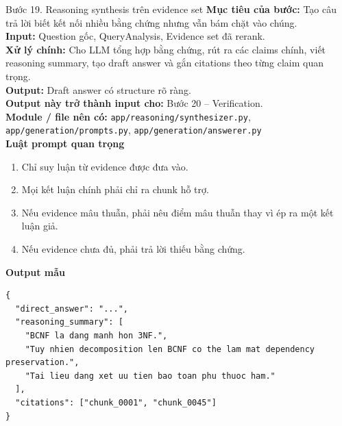 \documentclass[12pt,a4paper]{article}
\newcommand{\stepgoal}[1]{\textbf{Mục tiêu của bước:} #1\\}
\newcommand{\stepinput}[1]{\textbf{Input:} #1\\}
\newcommand{\stepprocess}[1]{\textbf{Xử lý chính:} #1\\}
\newcommand{\stepoutput}[1]{\textbf{Output:} #1\\}
\newcommand{\stepnext}[1]{\textbf{Output này trở thành input cho:} #1\\}
\newcommand{\stepmodules}[1]{\textbf{Module / file nên có:} #1\\}
\begin{document}
\begin{stepbox}{Bước 19. Reasoning synthesis trên evidence set}
\stepgoal{Tạo câu trả lời biết kết nối nhiều bằng chứng nhưng vẫn bám chặt vào chúng.}
\stepinput{Question gốc, QueryAnalysis, Evidence set đã rerank.}
\stepprocess{Cho LLM tổng hợp bằng chứng, rút ra các claims chính, viết reasoning summary, tạo draft answer và gắn citations theo từng claim quan trọng.}
\stepoutput{Draft answer có structure rõ ràng.}
\stepnext{Bước 20 -- Verification.}
\stepmodules{\texttt{app/reasoning/synthesizer.py}, \texttt{app/generation/prompts.py}, \texttt{app/generation/answerer.py}}

\textbf{Luật prompt quan trọng}
\begin{enumerate}[label=\arabic*.]
    \item Chỉ suy luận từ evidence được đưa vào.
    \item Mọi kết luận chính phải chỉ ra chunk hỗ trợ.
    \item Nếu evidence mâu thuẫn, phải nêu điểm mâu thuẫn thay vì ép ra một kết luận giả.
    \item Nếu evidence chưa đủ, phải trả lời thiếu bằng chứng.
\end{enumerate}

\textbf{Output mẫu}
\begin{lstlisting}
{
  "direct_answer": "...",
  "reasoning_summary": [
    "BCNF la dang manh hon 3NF.",
    "Tuy nhien decomposition len BCNF co the lam mat dependency preservation.",
    "Tai lieu dang xet uu tien bao toan phu thuoc ham."
  ],
  "citations": ["chunk_0001", "chunk_0045"]
}
\end{lstlisting}
\end{stepbox}
\end{document}
